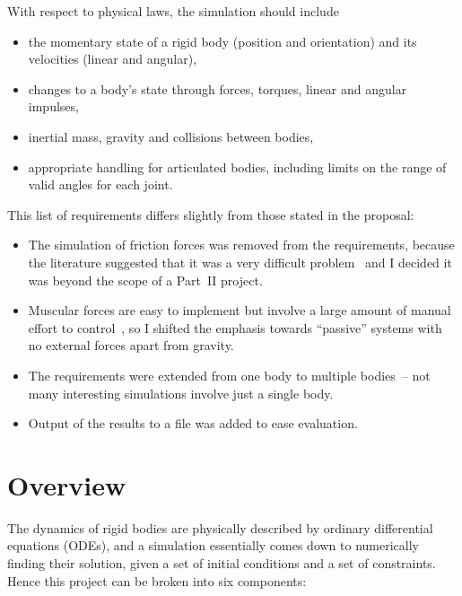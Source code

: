 With respect to physical laws, the simulation should include
\begin{itemize}
\item the momentary state of a rigid body (position and orientation) and its velocities (linear
    and angular),
\item changes to a body's state through forces, torques, linear and angular impulses,
\item inertial mass, gravity and collisions between bodies,
\item appropriate handling for articulated bodies, including limits on the range of valid angles
    for each joint.
\end{itemize}

This list of requirements differs slightly from those stated in the proposal:
\begin{itemize}
\item The simulation of friction forces was removed from the requirements, because the literature
    suggested that it was a very difficult problem~\cite{Baraff:PhD} and I decided it was beyond
    the scope of a Part~II project.
\item Muscular forces are easy to implement but involve a large amount of manual effort to
    control~\cite{Green:91}, so I shifted the emphasis towards ``passive'' systems with no
    external forces apart from gravity.
\item The requirements were extended from one body to multiple bodies~-- not many interesting
    simulations involve just a single body.
\item Output of the results to a file was added to ease evaluation.
\end{itemize}

\section{Overview\label{introOverview}}

The dynamics of rigid bodies are physically described by ordinary differential equations (ODEs),
and a simulation essentially comes down to numerically finding their solution, given a set of
initial conditions and a set of constraints. Hence this project can be broken into six components:

